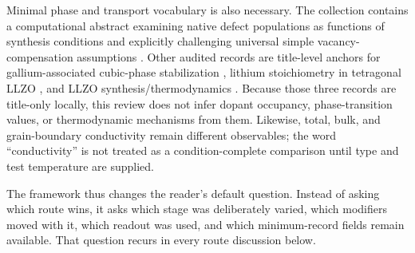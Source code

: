 Minimal phase and transport vocabulary is also necessary. The collection contains a computational abstract examining native defect populations as functions of synthesis conditions and explicitly challenging universal simple vacancy-compensation assumptions \cite{squires2019native}. Other audited records are title-level anchors for gallium-associated cubic-phase stabilization \cite{shinawi2013stabilization}, lithium stoichiometry in tetragonal LLZO \cite{ilina2014lithium}, and LLZO synthesis\slash thermodynamics \cite{aleksandrov2021superionic}. Because those three records are title-only locally, this review does not infer dopant occupancy, phase-transition values, or thermodynamic mechanisms from them. Likewise, total, bulk, and grain-boundary conductivity remain different observables; the word ``conductivity'' is not treated as a condition-complete comparison until type and test temperature are supplied.

The framework thus changes the reader's default question. Instead of asking which route wins, it asks which stage was deliberately varied, which modifiers moved with it, which readout was used, and which minimum-record fields remain available. That question recurs in every route discussion below.
